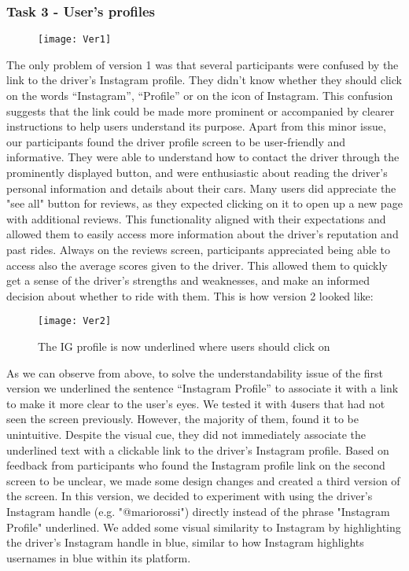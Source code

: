 \documentclass{article}
\begin{document}
\subsubsection{Task 3 - User's profiles}
\graphicspath{{Doc images/Paper prototyping/Task 3}}

\begin{figure}[htbp]
    \centering
    \texttt{[image: Ver1]}
\end{figure}

The only problem of version 1 was that several participants were confused by the link to the driver's Instagram profile. They didn't know whether they should click on the words “Instagram”, “Profile” or on the icon of Instagram. This confusion suggests that the link could be made more prominent or accompanied by clearer instructions to help users understand its purpose. Apart from this minor issue, our participants found the driver profile screen to be user-friendly and informative. They were able to understand how to contact the driver through the prominently displayed button, and were enthusiastic about reading the driver's personal information and details about their cars. Many users did appreciate the "see all" button for reviews, as they expected clicking on it to open up a new page with additional reviews. This functionality aligned with their expectations and allowed them to easily access more information about the driver's reputation and past rides. Always on the reviews screen, participants appreciated being able to access also the average scores given to the driver. This allowed them to quickly get a sense of the driver's strengths and weaknesses, and make an informed decision about whether to ride with them. This is how version 2 looked like: 

\begin{figure}[htbp]
    \centering
    \texttt{[image: Ver2]}
    \caption{The IG profile is now underlined where users should click on}
\end{figure}
\newpage

As we can observe from above, to solve the understandability issue of the first version we underlined the sentence “Instagram Profile” to associate it with a link to make it more clear to the user’s eyes. We tested it with 4users that had not seen the screen previously. However, the majority of them, found it to be unintuitive. Despite the visual cue, they did not immediately associate the underlined text with a clickable link to the driver's Instagram profile. Based on feedback from participants who found the Instagram profile link on the second screen to be unclear, we made some design changes and created a third version of the screen. In this version, we decided to experiment with using the driver's Instagram handle (e.g. "@mariorossi") directly instead of the phrase "Instagram Profile" underlined. We added some visual similarity to Instagram by highlighting the driver's Instagram handle in blue, similar to how Instagram highlights usernames in blue within its platform.
\end{document}
